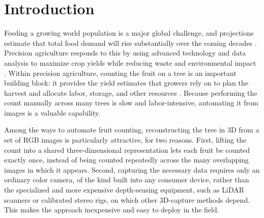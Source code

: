 \documentclass[english, egger, bsc]{vcethesis}
\begin{document}
\chapter{Introduction}
Feeding a growing world population is a major global challenge, and projections estimate that total food demand will rise substantially over the coming decades \cite{vandijk2021foodsecurity}. Precision agriculture responds to this by using advanced technology and data analysis to maximize crop yields while reducing waste and environmental impact \cite{karunathilake2023precision}. Within precision agriculture, counting the fruit on a tree is an important building block: it provides the yield estimates that growers rely on to plan the harvest and allocate labor, storage, and other resources \cite{miranda2023}. Because performing the count manually across many trees is slow and labor-intensive, automating it from images is a valuable capability.

Among the ways to automate fruit counting, reconstructing the tree in 3D from a set of RGB images is particularly attractive, for two reasons. First, lifting the count into a shared three-dimensional representation lets each fruit be counted exactly once, instead of being counted repeatedly across the many overlapping images in which it appears. Second, capturing the necessary data requires only an ordinary color camera, of the kind built into any consumer device, rather than the specialized and more expensive depth-sensing equipment, such as LiDAR scanners or calibrated stereo rigs, on which other 3D-capture methods depend. This makes the approach inexpensive and easy to deploy in the field.
\end{document}
